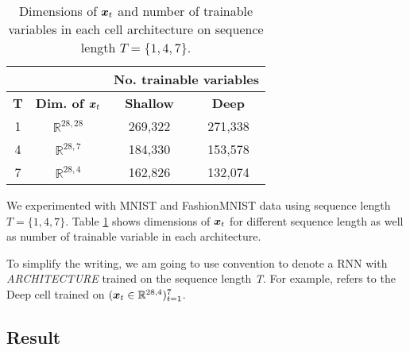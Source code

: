 \renewcommand{\arraystretch}{1.5}
\begin{table}[h]
\centering
\begin{tabular}{cc|c|c|}
\cline{3-4}
& & \multicolumn{2}{c|}{\textbf{No. trainable variables}}                                                                \\ \hline
\multicolumn{1}{|c|}{\textbf{T}}               & \multicolumn{1}{c|}{\textbf{Dim. of $\boldsymbol{x}_t$}} & \multicolumn{1}{c|}{\textbf{Shallow}} & \multicolumn{1}{c|}{\textbf{Deep}}  \\ \hline
\multicolumn{1}{|c|}{1} & $\mathbb{R}^{28,28}$ & 269,322  &  271,338 \\
\multicolumn{1}{|c|}{4} & $\mathbb{R}^{28,7}$ & 184,330 & 153,578 \\
\multicolumn{1}{|c|}{7} & $\mathbb{R}^{28,4}$ & 162,826 & 132,074 \\ \hline

\end{tabular}
\caption{Dimensions of $\patvector{x}_t$ and number of trainable variables in each cell architecture on sequence length $T=\{1, 4, 7\}$.}
\label{tab:seq-length}
\end{table}
\renewcommand{\arraystretch}{1}




We experimented with MNIST and FashionMNIST data using sequence length $T = \{1, 4, 7\}$.  Table \ref{tab:seq-length} shows dimensions of $\patvector{x}_t$ for different sequence length as well as number of trainable variable in each architecture.

To simplify the writing, we am going to use \textit{} convention to denote a RNN with \textit{ARCHITECTURE} trained on the sequence length \textit{T}. For example,  refers to the Deep cell trained on $(\boldsymbol{x}_t \in \mathbb{R}^{28,4} )_{t=1}^{7}$.

\subsection{Result}
\label{sec:exp1_result}

